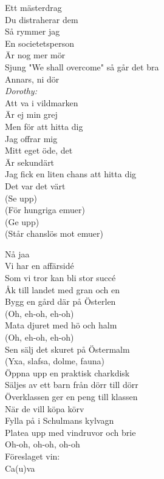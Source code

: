 \documentclass[a6paper, 10pt, twoside]{article}
\begin{document}
\begin{lyrics}
Ett mästerdrag\\
Du distraherar dem\\
Så rymmer jag\\
En societetsperson\\
Är nog mer mör\\
Sjung "We shall overcome" så går det bra\\
Annars, ni dör
\vspace{5pt}\\
\textit{Dorothy:}\\
Att va i vildmarken\\
Är ej min grej\\
Men för att hitta dig\\
Jag offrar mig\\
Mitt eget öde, det\\
Är sekundärt\\
Jag fick en liten chans att hitta dig\\
Det var det värt
\vspace{5pt}\\
(Se upp)\\
(För hungriga emuer)\\
(Ge upp)\\
(Står chanslös mot emuer)
\end{lyrics}

\begin{center}
\end{center}
\begin{lyrics}
Nå jaa
\vspace{5pt}\\
Vi har en affärsidé\\
Som vi tror kan bli stor succé\\
Åk till landet med gran och en\\
Bygg en gård där på Österlen
\vspace{5pt}\\
(Oh, eh-oh, eh-oh)\\
Mata djuret med hö och halm\\
(Oh, eh-oh, eh-oh)\\
Sen sälj det skuret på Östermalm\\
(Yxa, slafsa, dolme, fauna)
\vspace{5pt}\\
Öppna upp en praktisk charkdisk\\
Säljes av ett barn från dörr till dörr\\
Överklassen ger en peng till klassen\\
När de vill köpa körv\\
Fylla på i Schulmans kylvagn\\
Platea upp med vindruvor och brie\\
Oh-oh, oh-oh, oh-oh\\
Föreslaget vin:\\
Ca(u)va
\end{lyrics}
\end{document}
